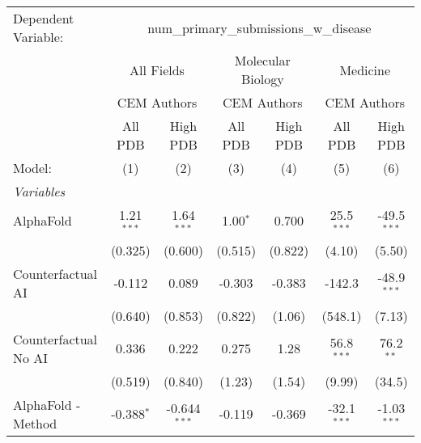 \begingroup
\centering
\begin{tabular}{lcccccc}
   \tabularnewline \midrule \midrule
   Dependent Variable: & \multicolumn{6}{c}{num\_primary\_submissions\_w\_disease}\\
 & \multicolumn{2}{c}{All Fields} & \multicolumn{2}{c}{Molecular Biology} & \multicolumn{2}{c}{Medicine} \\
\cmidrule(lr){2-3} \cmidrule(lr){4-5} \cmidrule(lr){6-7}
 & \multicolumn{2}{c}{CEM Authors} & \multicolumn{2}{c}{CEM Authors} & \multicolumn{2}{c}{CEM Authors} \\
\cmidrule(lr){2-3} \cmidrule(lr){4-5} \cmidrule(lr){6-7}
 & \multicolumn{1}{c}{All PDB} & \multicolumn{1}{c}{High PDB} & \multicolumn{1}{c}{All PDB} & \multicolumn{1}{c}{High PDB} & \multicolumn{1}{c}{All PDB} & \multicolumn{1}{c}{High PDB} \\
\cmidrule(lr){2-2} \cmidrule(lr){3-3} \cmidrule(lr){4-4} \cmidrule(lr){5-5} \cmidrule(lr){6-6} \cmidrule(lr){7-7}
   Model:                                                     & (1)           & (2)            & (3)          & (4)           & (5)           & (6)\\  
   \midrule
   \emph{Variables}\\
   AlphaFold                                                  & 1.21$^{***}$  & 1.64$^{***}$   & 1.00$^{*}$   & 0.700         & 25.5$^{***}$  & -49.5$^{***}$\\   
                                                              & (0.325)       & (0.600)        & (0.515)      & (0.822)       & (4.10)        & (5.50)\\   
   Counterfactual AI                                          & -0.112        & 0.089          & -0.303       & -0.383        & -142.3        & -48.9$^{***}$\\   
                                                              & (0.640)       & (0.853)        & (0.822)      & (1.06)        & (548.1)       & (7.13)\\   
   Counterfactual No AI                                       & 0.336         & 0.222          & 0.275        & 1.28          & 56.8$^{***}$  & 76.2$^{**}$\\   
                                                              & (0.519)       & (0.840)        & (1.23)       & (1.54)        & (9.99)        & (34.5)\\   
   AlphaFold - Method                                         & -0.388$^{*}$  & -0.644$^{***}$ & -0.119       & -0.369        & -32.1$^{***}$ & -1.03$^{***}$\\   

\end{tabular}
